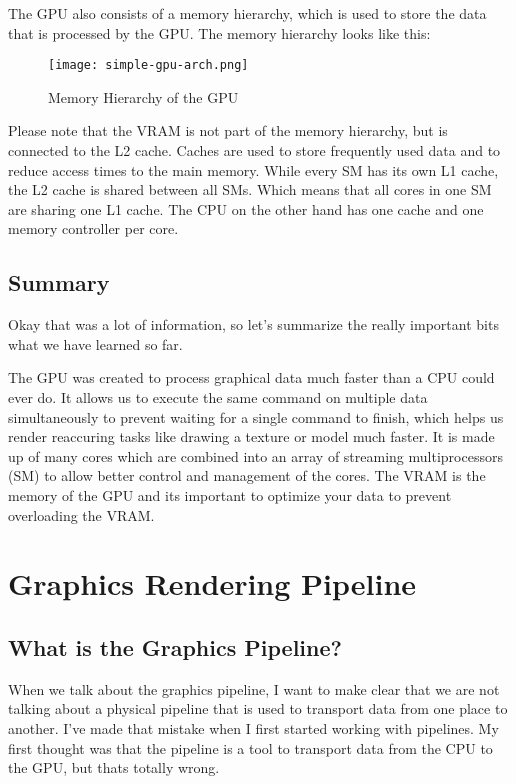 \documentclass[12pt]{report} \usepackage{preamble}
\begin{document}
The GPU also consists of a memory hierarchy, which is used to store the
data that is processed by the GPU. The memory hierarchy looks like this:

\begin{figure}[hbtp]
	\centering
	\texttt{[image: simple-gpu-arch.png]}
	\caption{Memory Hierarchy of the GPU \cite{fig:gpu-arch}}
\end{figure}

Please note that the VRAM is not part of the memory hierarchy, but is
connected to the L2 cache. Caches are used to store frequently used
data and to reduce access times to the main memory. While every SM
has its own L1 cache, the L2 cache is shared between all SMs. Which
means that all cores in one SM are sharing one L1 cache. The CPU
on the other hand has one cache and one memory controller per
core. \cite{CUDA_Programming_Guide}

\section {Summary}

Okay that was a lot of information, so let's summarize the really
important bits what we have learned so far.

The GPU was created to process graphical data much faster than a CPU
could ever do. It allows us to execute the same command on multiple
data simultaneously to prevent waiting for a single command to finish,
which helps us render reaccuring tasks like drawing a texture or model
much faster.  It is made up of many cores which are combined into an
array of streaming multiprocessors (SM) to allow better control and
management of the cores.  The VRAM is the memory of the GPU and its
important to optimize your data to prevent overloading the VRAM.

\chapter{Graphics Rendering Pipeline}

\section{What is the Graphics Pipeline?}

When we talk about the graphics pipeline, I want to make clear that we
are not talking about a physical pipeline that is used to transport data
from one place to another. I've made that mistake when I first started
working with pipelines. My first thought was that the pipeline is a tool
to transport data from the CPU to the GPU, but thats totally wrong.
\end{document}
